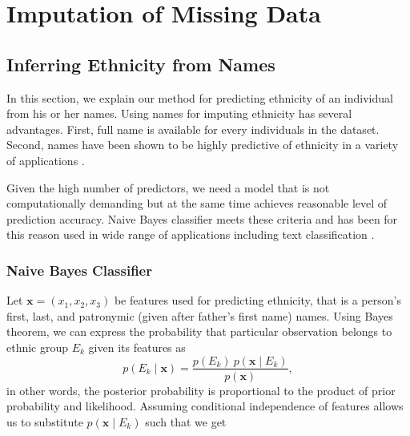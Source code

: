 \newpage
\section{Imputation of Missing Data} \label{sec:missing_data}
\subsection{Inferring Ethnicity from Names} \label{subsec:inferring_ethnicity}
In this section, we explain our method for predicting ethnicity of an individual from his or her names. Using names for imputing ethnicity has several advantages. First, full name  is available for every individuals in the dataset. Second, names have been shown to be highly predictive of ethnicity in a variety of applications \citep{mateos_review_2007, hofstra_sources_2017, hofstra_predicting_2018}. 

Given the high number of predictors, we need a model that is not  computationally demanding but at the same time achieves reasonable level of prediction accuracy. Naive Bayes classifier meets these criteria and has been for this reason used in wide range of applications including text classification  \citep{gentzkow_text_2019}.

\subsubsection{Naive Bayes Classifier}
Let  $\boldsymbol{x} = \left(x_1, x_2, x_3\right)$ be features used for predicting ethnicity, that is a person's first, last, and patronymic (given after father's first name) names. Using Bayes theorem, we can express the probability that particular observation  belongs to ethnic group $E_k$ given its features as
\begin{equation}
p(E_k \mid \mathbf{x}) = \frac{p(E_k) \ p(\mathbf{x} \mid E_k)}{p(\mathbf{x})},
\end{equation}
in other words, the posterior probability is proportional to the product of prior probability and likelihood. 
Assuming conditional independence of features allows us to substitute $p(\mathbf{x} \mid E_k)$ such that we get

